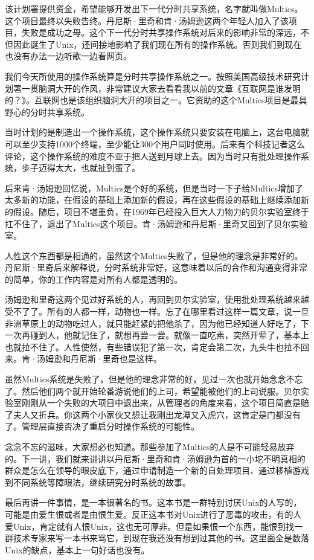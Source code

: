 \documentclass[
  letterpaper,
  DIV=11,
  numbers=noendperiod]{scrreprt}
\begin{document}
该计划署提供资金，希望能够开发出下一代分时共享系统，名字就叫做Multics。这个项目最终以失败告终。丹尼斯·里奇和肯·汤姆逊这两个年轻人加入了该项目，失败是成功之母。这个下一代分时共享操作系统对后来的影响非常的深远，不但因此诞生了Unix，还间接地影响了我们现在所有的操作系统。否则我们到现在也没有办法一边听歌一边看网页。

我们今天所使用的操作系统算是分时共享操作系统之一。按照美国高级技术研究计划署一贯脑洞大开的作风，非常建议大家去看看我以前的文章《互联网是谁发明的？》。互联网也是该组织脑洞大开的项目之一。它资助的这个Multics项目是最具野心的分时共享系统。

当时计划的是制造出一个操作系统，这个操作系统只要安装在电脑上，这台电脑就可以至少支持1000个终端，至少能让300个用户同时使用。后来有个科技记者这么评论，这个操作系统的难度不亚于把人送到月球上去。因为当时只有批处理操作系统，步子迈得太大，也就扯到蛋了。

后来肯·汤姆逊回忆说，Multics是个好的系统，但是当时一下子给Multics增加了太多新的功能，在假设的基础上添加新的假设，再在这些假设的基础上继续添加新的假设。随后，项目不堪重负，在1969年已经投入巨大人力物力的贝尔实验室终于扛不住了，退出了Multics这个项目。肯·汤姆逊和丹尼斯·里奇又回到了贝尔实验室。

人性这个东西都是相通的，虽然这个Multics失败了，但是他的理念是非常好的。丹尼斯·里奇后来解释说，分时系统非常好，这意味着以后的合作和沟通变得非常的简单，你的工作内容是对所有人都是透明的。

汤姆逊和里奇这两个见过好系统的人，再回到贝尔实验室，使用批处理系统越来越受不了了。所有的人都一样，动物也一样。忘了在哪里看过这样一篇文章，说一旦非洲草原上的动物吃过人，就只能赶紧的把他杀了，因为他已经知道人好吃了，下一次再碰到人，他就记住了，就想再尝一尝。就像一直吃素，突然开荤了，基本上也就拉不住了。人性使然，有些错误犯了第一次，肯定会第二次，九头牛也拉不回来。肯·汤姆逊和丹尼斯·里奇也是这样。

虽然Multics系统是失败了，但是他的理念非常的好，见过一次也就开始念念不忘了。然后他们两个就开始轮番游说他们的上司，希望能被他们的上司说服。贝尔实验室刚刚从一个失败的大项目中退出来，从管理者的角度来看，这个项目简直是赔了夫人又折兵。你这两个小家伙又想让我刚出龙潭又入虎穴，这肯定是门都没有了。管理层直接否决了重启分时操作系统的可能性。

念念不忘的滋味，大家想必也知道。那些参加了Multics的人是不可能轻易放弃的。下一讲，我们就来讲讲以丹尼斯·里奇和肯·汤姆逊为首的一小坨不明真相的群众是怎么在领导的眼皮底下，通过申请制造一个新的自处理项目、通过移植游戏到不同系统等障眼法，继续研究分时系统的故事。

最后再讲一件事情，是一本很著名的书。这本书是一群特别讨厌Unix的人写的，可能是由爱生恨或者是由恨生爱。反正这本书对Unix进行了恶毒的攻击，有的人爱Unix，肯定就有人恨Unix，这也无可厚非。但是如果恨一个东西，能恨到找一群技术专家来写一本书来骂它，到现在我还没有想到过其他的书。这里面全是数落Unix的缺点，基本上一句好话也没有。
\end{document}
